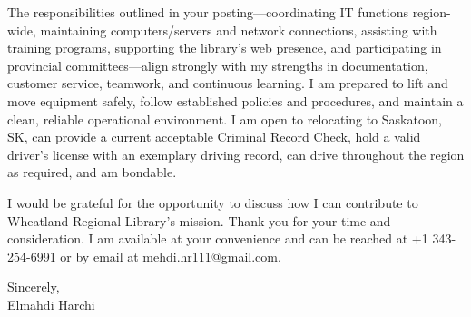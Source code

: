 \documentclass[letterpaper,11pt]{article}
\begin{document}
The responsibilities outlined in your posting—coordinating IT functions region-wide, maintaining computers/servers and network connections, assisting with training programs, supporting the library’s web presence, and participating in provincial committees—align strongly with my strengths in documentation, customer service, teamwork, and continuous learning. I am prepared to lift and move equipment safely, follow established policies and procedures, and maintain a clean, reliable operational environment. I am open to relocating to Saskatoon, SK, can provide a current acceptable Criminal Record Check, hold a valid driver’s license with an exemplary driving record, can drive throughout the region as required, and am bondable.

I would be grateful for the opportunity to discuss how I can contribute to Wheatland Regional Library’s mission. Thank you for your time and consideration. I am available at your convenience and can be reached at +1 343-254-6991 or by email at mehdi.hr111@gmail.com.

Sincerely,\\[10pt]
Elmahdi Harchi
\end{document}
